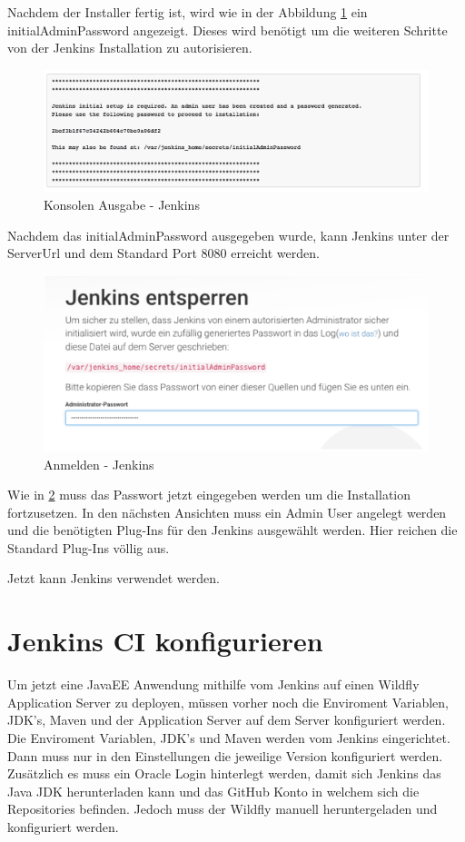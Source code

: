 Nachdem der Installer fertig ist, wird wie in der Abbildung \ref{img:consoleoutput} ein initialAdminPassword angezeigt. Dieses wird benötigt um die weiteren Schritte von der Jenkins Installation zu autorisieren.

\begin{figure}[h]
\centering
\includegraphics[width=1\textwidth]{images/09_CI/consoleOutput.png}
\caption{Konsolen Ausgabe - Jenkins}
\label{img:consoleoutput}
\end{figure}

Nachdem das initialAdminPassword ausgegeben wurde, kann Jenkins unter der ServerUrl  und dem Standard Port 8080 erreicht werden. 

\begin{figure}[h]
\centering
\includegraphics[width=1\textwidth]{images/09_CI/initial.png}
\caption{Anmelden - Jenkins}
\label{img:login}
\end{figure}

Wie in \ref{img:login} muss das Passwort jetzt eingegeben werden um die Installation fortzusetzen. In den nächsten Ansichten muss ein Admin User angelegt werden und die benötigten Plug-Ins für den Jenkins ausgewählt werden. Hier reichen die Standard Plug-Ins völlig aus.

Jetzt kann Jenkins verwendet werden.

\section{Jenkins CI konfigurieren}
\label{sec:jenkinsconfiguration}
Um jetzt eine JavaEE Anwendung mithilfe vom Jenkins auf einen Wildfly Application Server zu deployen, müssen vorher noch die Enviroment Variablen, JDK's, Maven und der Application Server auf dem Server konfiguriert werden. Die Enviroment Variablen, JDK's und Maven werden vom Jenkins eingerichtet. Dann muss nur in den Einstellungen die jeweilige Version konfiguriert werden. Zusätzlich es muss ein Oracle Login hinterlegt werden, damit sich Jenkins das Java JDK herunterladen kann und das GitHub Konto in welchem sich die Repositories befinden. Jedoch muss der Wildfly manuell heruntergeladen und konfiguriert werden.

